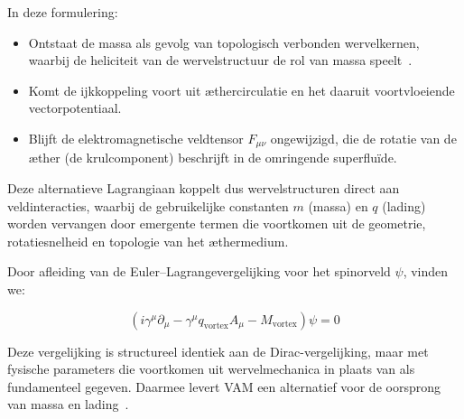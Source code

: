 In deze formulering:

\begin{itemize}
    \item Ontstaat de massa als gevolg van topologisch verbonden wervelkernen, waarbij de heliciteit van de wervelstructuur de rol van massa speelt~\cite{Volovik2003}.
    \item Komt de ijkkoppeling voort uit æthercirculatie en het daaruit voortvloeiende vectorpotentiaal.
    \item Blijft de elektromagnetische veldtensor \( F_{\mu\nu} \) ongewijzigd, die de rotatie van de æther (de krulcomponent) beschrijft in de omringende superfluïde.
\end{itemize}

Deze alternatieve Lagrangiaan koppelt dus wervelstructuren direct aan veldinteracties, waarbij de gebruikelijke constanten \( m \) (massa) en \( q \) (lading) worden vervangen door emergente termen die voortkomen uit de geometrie, rotatiesnelheid en topologie van het æthermedium.

Door afleiding van de Euler–Lagrangevergelijking voor het spinorveld \( \psi \), vinden we:

\begin{equation}
    \boxed{ \left( i \gamma^\mu \partial_\mu - \gamma^\mu q_{\text{vortex}} A_\mu - M_{\text{vortex}} \right)\psi = 0 }
\end{equation}

Deze vergelijking is structureel identiek aan de Dirac-vergelijking, maar met fysische parameters die voortkomen uit wervelmechanica in plaats van als fundamenteel gegeven. Daarmee levert VAM een alternatief voor de oorsprong van massa en lading~\cite{Barcelo2011,Volovik2003}.
